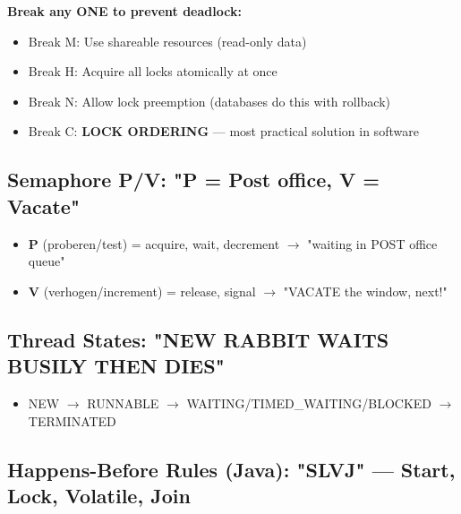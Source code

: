 \documentclass[11pt]{article}
\providecommand{\tightlist}{\setlength{\itemsep}{1pt}\setlength{\parskip}{0pt}}
\begin{document}
\textbf{Break any ONE to prevent deadlock:}

\begin{itemize}
\tightlist
\item
  Break M: Use shareable resources (read-only data)
\item
  Break H: Acquire all locks atomically at once
\item
  Break N: Allow lock preemption (databases do this with rollback)
\item
  Break C: \textbf{LOCK ORDERING} --- most practical solution in software
\end{itemize}

\subsection{\texorpdfstring{Semaphore P/V: \textbf{"P = Post office, V = Vacate"}}{Semaphore P/V: "P = Post office, V = Vacate"}}\label{semaphore-pv-p--post-office-v--vacate}

\begin{itemize}
\tightlist
\item
  \textbf{P} (proberen/test) = acquire, wait, decrement \(\rightarrow\) "waiting in POST office queue"
\item
  \textbf{V} (verhogen/increment) = release, signal \(\rightarrow\) "VACATE the window, next!"
\end{itemize}

\subsection{\texorpdfstring{Thread States: \textbf{"NEW RABBIT WAITS BUSILY THEN DIES"}}{Thread States: "NEW RABBIT WAITS BUSILY THEN DIES"}}\label{thread-states-new-rabbit-waits-busily-then-dies}

\begin{itemize}
\tightlist
\item
  NEW \(\rightarrow\) RUNNABLE \(\rightarrow\) WAITING/TIMED\_WAITING/BLOCKED \(\rightarrow\) TERMINATED
\end{itemize}

\subsection{\texorpdfstring{Happens-Before Rules (Java): \textbf{"SLVJ"} --- Start, Lock, Volatile, Join}{Happens-Before Rules (Java): "SLVJ" --- Start, Lock, Volatile, Join}}\label{happens-before-rules-java-slvj--start-lock-volatile-join}
\end{document}
